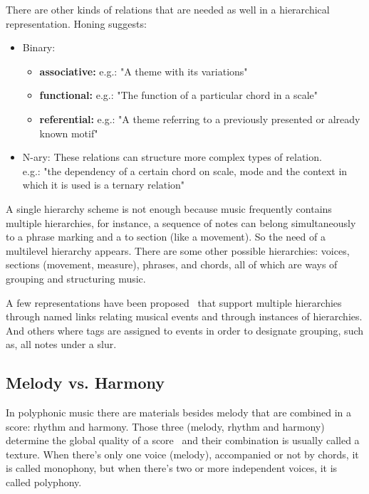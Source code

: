 There are other kinds of relations that are needed as well in a hierarchical representation.
Honing\cite{Honing1993} suggests:

\begin{itemize}
  \item Binary:
    \begin{itemize}
      \item \textbf{associative:}
        e.g.: "A theme with its variations"
      \item \textbf{functional:}
        e.g.: "The function of a particular chord in a scale"
      \item \textbf{referential:}
        e.g.: "A theme referring to a previously presented or already known motif"
    \end{itemize}
  \item N-ary:
    These relations can structure more complex types of relation.\\
    e.g.: "the dependency of a certain chord on scale, mode and the context in which it is used is a
    ternary relation"
\end{itemize}

A single hierarchy scheme is not enough because music frequently contains multiple hierarchies, for
instance, a sequence of notes can belong simultaneously to a phrase marking and a to section (like a
movement). So the need of a multilevel hierarchy appears. There are some other possible hierarchies:
voices, sections (movement, measure), phrases, and chords, all of which are ways of
grouping and structuring music.

A few representations have been proposed~\cite{Dannenberg1990,Brinkman1984} that support multiple
hierarchies through named links relating musical events and through instances of hierarchies. And
others where tags are assigned to events in order to designate grouping, such as, all notes under a
slur.

\subsection{Melody vs. Harmony}

In polyphonic music there are materials besides melody that are combined in a score: rhythm and
harmony. Those three (melody, rhythm and harmony) determine the global quality of a
score~\cite{benward2003music} and their combination is usually called a texture. When there's only
one voice (melody), accompanied or not by chords, it is called monophony, but when there's two or
more independent voices, it is called polyphony.

